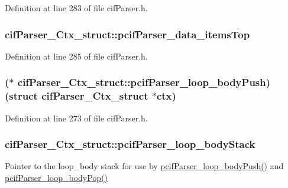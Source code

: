 Definition at line 283 of file cif\-Parser.\-h.

\hypertarget{structcif_parser___ctx__struct_acdf4740ef4059a5aed2ecb56ed2d1671}{
\subsubsection[{pcif\-Parser\-\_\-data\-\_\-items\-Top}]{ cif\-Parser\-\_\-\-Ctx\-\_\-struct\-::pcif\-Parser\-\_\-data\-\_\-items\-Top}}\label{structcif_parser___ctx__struct_acdf4740ef4059a5aed2ecb56ed2d1671}


Definition at line 285 of file cif\-Parser.\-h.

\hypertarget{structcif_parser___ctx__struct_a6b373b1b4ec4bdb9934d6a484210f668}{
\subsubsection[{pcif\-Parser\-\_\-loop\-\_\-body\-Push}]{($\ast$ cif\-Parser\-\_\-\-Ctx\-\_\-struct\-::pcif\-Parser\-\_\-loop\-\_\-body\-Push)(struct {\bf cif\-Parser\-\_\-\-Ctx\-\_\-struct} $\ast$ctx)}}\label{structcif_parser___ctx__struct_a6b373b1b4ec4bdb9934d6a484210f668}


Definition at line 273 of file cif\-Parser.\-h.

\hypertarget{structcif_parser___ctx__struct_a2f617afc3c3bc1469e67022c6c1f734c}{
\subsubsection[{pcif\-Parser\-\_\-loop\-\_\-body\-Stack}]{ cif\-Parser\-\_\-\-Ctx\-\_\-struct\-::pcif\-Parser\-\_\-loop\-\_\-body\-Stack}}\label{structcif_parser___ctx__struct_a2f617afc3c3bc1469e67022c6c1f734c}
Pointer to the loop\-\_\-body stack for use by \hyperlink{structcif_parser___ctx__struct_a6b373b1b4ec4bdb9934d6a484210f668}{pcif\-Parser\-\_\-loop\-\_\-body\-Push()} and \hyperlink{cif_parser_8cpp_a601682aa8698de0926507ce39a2ac0dc}{pcif\-Parser\-\_\-loop\-\_\-body\-Pop()} 

